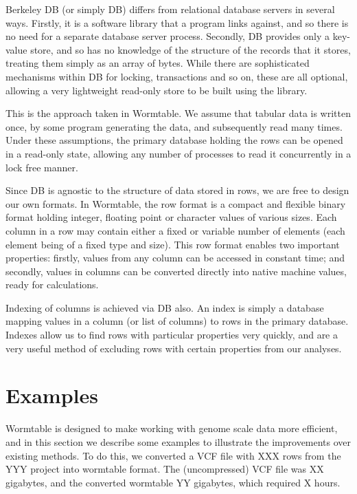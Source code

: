 \documentclass{bioinfo}
\begin{document}
Berkeley DB (or simply DB) 
differs from relational database servers in several ways. 
Firstly, it is a software library that a program links against, 
and so there is no need for a separate database server process.
Secondly, DB provides only a key-value store, and so has 
no knowledge of the structure of the records that it stores,
treating them simply as an array of bytes. While there 
are sophisticated 
mechanisms within DB for locking, transactions and so on, 
these are all optional, allowing a very lightweight 
read-only store to be built using the library.

This is the approach taken in Wormtable. We assume that tabular data 
is written once, by some program generating the data, and subsequently 
read many times. Under these assumptions, the primary database 
holding the rows can be opened in a read-only state, allowing any 
number of processes to read it concurrently in a lock free manner.

Since DB is agnostic to the structure of data stored in rows, we 
are free to design our own formats. In Wormtable, the row format is
a compact and flexible binary format holding integer, floating point 
or character values of various sizes. Each column in a row may contain 
either a fixed or variable number of elements (each element being of a
fixed type and size). This row format enables two important properties:
firstly, values from any column can be accessed in constant 
time; and secondly, values in columns can be converted directly into 
native machine values, ready for calculations.

Indexing of columns is achieved via DB also. An index is simply a
database mapping values in a column (or list of columns) to rows 
in the primary database. Indexes allow us to find rows with particular 
properties very quickly, and are a very useful method of excluding 
rows with certain properties from our analyses.

\section{Examples}
Wormtable is designed to make working with genome scale data more 
efficient, and in this section we describe some examples to 
illustrate the improvements over existing methods. To do this, 
we converted a VCF file with XXX rows from the YYY project 
into wormtable format. The (uncompressed) VCF file was XX
gigabytes, and the converted wormtable YY gigabytes, which required 
X hours.
\end{document}

